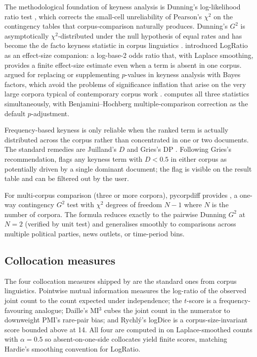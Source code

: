 \documentclass[codesnippet]{jss}
\newcommand{\fct}[1]{\code{#1()}}
\begin{document}
The methodological foundation of keyness analysis is Dunning's
log-likelihood ratio test \citep{dunning1993}, which corrects the
small-cell unreliability of Pearson's $\chi^2$ on the contingency
tables that corpus-comparison naturally produces. Dunning's
$G^2$ is asymptotically $\chi^2$-distributed under the null
hypothesis of equal rates and has become the de facto keyness
statistic in corpus linguistics
\citep{gabrielatos2018,scottwordsmith}.
\cite{hardie2014logratio} introduced LogRatio as an effect-size
companion: a log-base-2 odds ratio that, with Laplace smoothing,
provides a finite effect-size estimate even when a term is absent
in one corpus. \cite{wilson2013} argued for replacing or
supplementing $p$-values in keyness analysis with Bayes factors,
which avoid the problems of significance inflation that arise on
the very large corpora typical of contemporary corpus work
\citep{kass1995}.  computes all three statistics
simultaneously, with Benjamini--Hochberg multiple-comparison
correction \citep{benjamini1995fdr} as the default
$p$-adjustment.

Frequency-based keyness is only reliable when the ranked term is
actually distributed across the corpus rather than concentrated
in one or two documents. The standard remedies are Juilland's $D$
\citep{juilland1964} and Gries's DP \citep{gries2008}. Following
Gries's recommendation,  flags any keyness term
with $D < 0.5$ in either corpus as potentially driven by a single
dominant document; the flag is visible on the result table and
can be filtered out by the user.

For multi-corpus comparison (three or more corpora), pycorpdiff
provides \fct{keyness\_multi}, a one-way contingency $G^2$ test
with $\chi^2$ degrees of freedom $N - 1$ where $N$ is the number
of corpora. The formula reduces exactly to the pairwise Dunning
$G^2$ at $N = 2$ (verified by unit test) and generalises smoothly
to comparisons across multiple political parties, news outlets,
or time-period bins.

\subsection{Collocation measures}

The four collocation measures shipped by  are the
standard ones from corpus linguistics. Pointwise mutual
information \citep{church1991} measures the log-ratio of the
observed joint count to the count expected under independence;
the $t$-score \citep{church1991} is a frequency-favouring
analogue; Daille's MI$^3$ \citep{daille1994} cubes the joint
count in the numerator to downweight PMI's rare-pair bias; and
Rychl\'y's logDice \citep{rychly2008} is a corpus-size-invariant
score bounded above at 14. All four are computed in
 on Laplace-smoothed counts with $\alpha = 0.5$
so absent-on-one-side collocates yield finite scores, matching
Hardie's smoothing convention for LogRatio.
\end{document}
